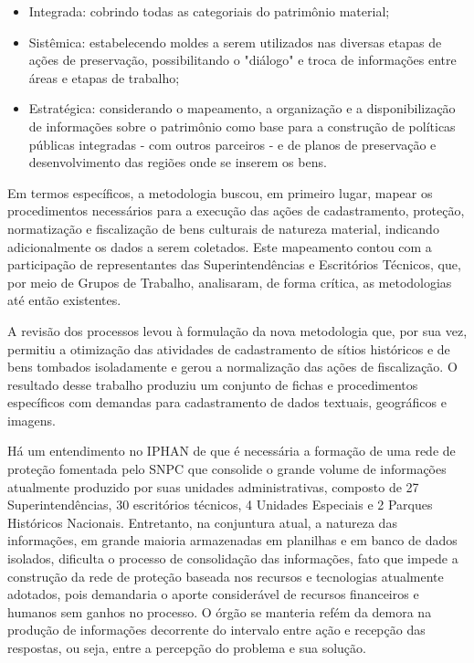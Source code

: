 \begin{itemize}
\item Integrada: cobrindo todas as categoriais do patrimônio material;
\item Sistêmica: estabelecendo moldes a serem utilizados nas diversas etapas de ações de preservação, possibilitando o "diálogo" e troca de informações entre áreas e etapas de trabalho;
\item Estratégica: considerando o mapeamento, a organização e a disponibilização de informações sobre o patrimônio como base para a construção de políticas públicas integradas - com outros parceiros - e de planos de preservação e desenvolvimento das regiões onde se inserem os bens.
\end{itemize}

Em termos específicos, a metodologia buscou, em primeiro lugar, mapear os procedimentos necessários para a execução das ações de cadastramento, proteção, normatização e fiscalização de bens culturais de natureza material, indicando adicionalmente os dados a serem coletados. Este mapeamento contou com a participação de representantes das Superintendências e Escritórios Técnicos, que, por meio de Grupos de Trabalho, analisaram, de forma crítica, as metodologias até então existentes.

A revisão dos processos levou à formulação da nova metodologia que, por sua vez, permitiu a otimização das atividades de cadastramento de sítios históricos e de bens tombados isoladamente e gerou a normalização das ações de fiscalização. O resultado desse trabalho produziu um conjunto de fichas e procedimentos específicos com demandas para cadastramento de dados textuais, geográficos e imagens.

Há um entendimento no IPHAN de que é necessária a formação de uma rede de proteção fomentada pelo SNPC que consolide o grande volume de informações atualmente produzido por suas unidades administrativas, composto de 27 Superintendências, 30 escritórios técnicos, 4 Unidades Especiais e 2 Parques Históricos Nacionais. Entretanto, na conjuntura atual, a natureza das informações, em grande maioria armazenadas em planilhas e em banco de dados isolados, dificulta o processo de consolidação das informações, fato 
que impede a construção da rede de proteção baseada nos recursos e tecnologias atualmente adotados, pois demandaria o aporte considerável de recursos financeiros e humanos sem ganhos no processo. O órgão se manteria refém da demora na produção de informações decorrente do intervalo entre ação e recepção das respostas, ou seja, entre a percepção do problema e sua solução.

